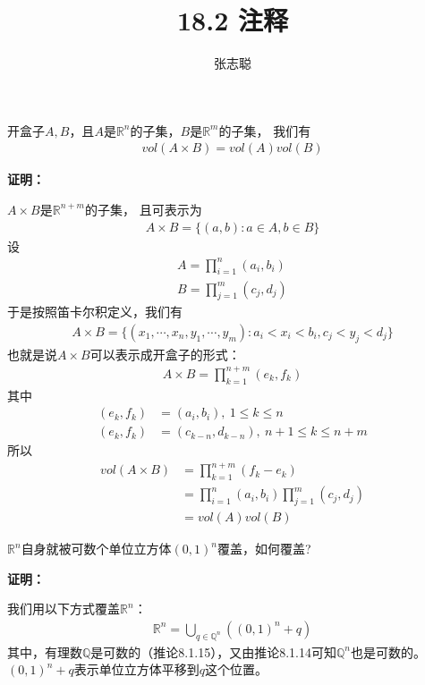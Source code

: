 \documentclass{article}
\begin{document}
\title{18.2 注释}
\author{张志聪}
\maketitle

\begin{zremark}
  开盒子$A, B$，且$A$是$\mathbb{R}^n$的子集，$B$是$\mathbb{R}^m$的子集，
  我们有
  \begin{align*}
    vol(A \times B) = vol(A) vol(B)
  \end{align*}
\end{zremark}

\textbf{证明：}

$A \times B$是$\mathbb{R}^{n + m}$的子集，
且可表示为
\begin{align*}
  A \times B = \{(a, b): a \in A, b \in B\}
\end{align*}
设
\begin{align*}
  A = \prod\limits_{i = 1}^n (a_i, b_i) \\
  B = \prod\limits_{j = 1}^m (c_j, d_j)
\end{align*}
于是按照笛卡尔积定义，我们有
\begin{align*}
  A \times B = \{(x_1, \cdots, x_n, y_1, \cdots, y_m): a_i < x_i < b_i, c_j < y_j < d_j\}
\end{align*}
也就是说$A \times B$可以表示成开盒子的形式：
\begin{align*}
  A \times B = \prod\limits_{k = 1}^{n + m} (e_k, f_k)
\end{align*}
其中
\begin{align*}
  (e_k, f_k) & = (a_i, b_i), \ 1 \leq k \leq n                     \\
  (e_k, f_k) & = (c_{k - n}, d_{k - n}), \ n + 1 \leq k \leq n + m
\end{align*}
所以
\begin{align*}
  vol(A \times B) & = \prod\limits_{k = 1}^{n + m} (f_k - e_k)                                \\
                  & = \prod\limits_{i = 1}^{n} (a_i, b_i) \prod\limits_{j = 1}^{m} (c_j, d_j) \\
                  & = vol(A) vol(B)
\end{align*}

\begin{zremark}
  $\mathbb{R}^n$自身就被可数个单位立方体$(0,1)^n$覆盖，如何覆盖?
\end{zremark}

\textbf{证明：}

我们用以下方式覆盖$\mathbb{R}^n$：
\begin{align*}
  \mathbb{R}^n = \bigcup\limits_{q \in \mathbb{Q}^n}((0, 1)^n + q)
\end{align*}
其中，有理数$\mathbb{Q}$是可数的（推论8.1.15），又由推论8.1.14可知$\mathbb{Q}^n$也是可数的。
$(0, 1)^n + q$表示单位立方体平移到$q$这个位置。
\end{document}
